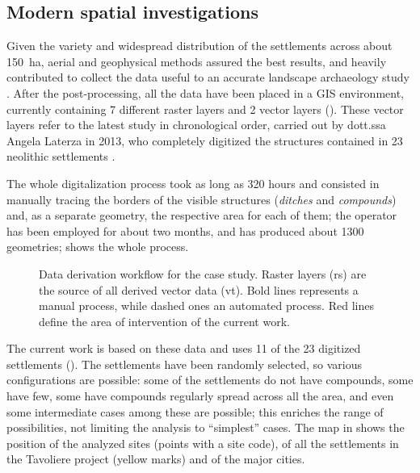         \subsection{Modern spatial investigations}
            Given the variety and widespread distribution of the settlements across about \SI{150}{\hectare}, aerial and geophysical methods assured the best results, and heavily contributed to collect the data useful to an accurate landscape archaeology study \cite[pp.~45--48]{remote-ciminale}. After the post-processing, all the data have been placed in a GIS environment, currently containing 7 different raster layers and 2 vector layers (). These vector layers refer to the latest study in chronological order, carried out by dott.ssa Angela Laterza in 2013, who completely digitized the structures contained in 23 neolithic settlements \cite{laterza}. 
            
            The whole digitalization process took as long as 320 hours and consisted in manually tracing the borders of the visible structures (\emph{ditches} and \emph{compounds}) and, as a separate geometry, the respective area for each of them; the operator has been employed for about two months, and has produced about 1300 geometries;  shows the whole process.

            \begin{figure}[H]
                \caption[Data deriving workflow for the Tavoliere project]{Data derivation workflow for the case study. Raster layers (\textsf{rs}) are the source of all derived vector data (\textsf{vt}). Bold lines represents a manual process, while dashed ones an automated process. Red lines define the area of intervention of the current work.}
                \label{fig:scheme-derive}
            \end{figure}

            The current work is based on these data and uses 11 of the 23 digitized settlements (). The settlements have been randomly selected, so various configurations are possible: some of the settlements do not have compounds, some have few, some have compounds regularly spread across all the area, and even some intermediate cases among these are possible; this enriches the range of possibilities, not limiting the analysis to ``simplest'' cases. The map in  shows the position of the analyzed sites (points with a site code), of all the settlements in the Tavoliere project (yellow marks) and of the major cities.
            

